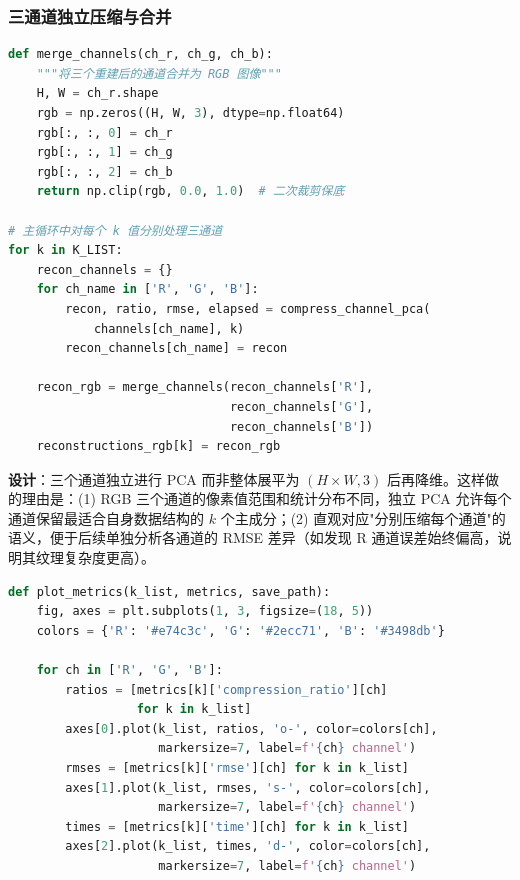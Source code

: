 \documentclass[a4paper]{article}
\begin{document}
\subsubsection{三通道独立压缩与合并}

\begin{lstlisting}[language=Python, caption=rgb_task.py——三通道独立PCA + 合并]
def merge_channels(ch_r, ch_g, ch_b):
    """将三个重建后的通道合并为 RGB 图像"""
    H, W = ch_r.shape
    rgb = np.zeros((H, W, 3), dtype=np.float64)
    rgb[:, :, 0] = ch_r
    rgb[:, :, 1] = ch_g
    rgb[:, :, 2] = ch_b
    return np.clip(rgb, 0.0, 1.0)  # 二次裁剪保底

# 主循环中对每个 k 值分别处理三通道
for k in K_LIST:
    recon_channels = {}
    for ch_name in ['R', 'G', 'B']:
        recon, ratio, rmse, elapsed = compress_channel_pca(
            channels[ch_name], k)
        recon_channels[ch_name] = recon

    recon_rgb = merge_channels(recon_channels['R'],
                               recon_channels['G'],
                               recon_channels['B'])
    reconstructions_rgb[k] = recon_rgb
\end{lstlisting}

\textbf{设计}：三个通道独立进行 PCA 而非整体展平为 $(H \times W, 3)$ 后再降维。这样做的理由是：(1) RGB 三个通道的像素值范围和统计分布不同，独立 PCA 允许每个通道保留最适合自身数据结构的 $k$ 个主成分；(2) 直观对应"分别压缩每个通道"的语义，便于后续单独分析各通道的 RMSE 差异（如发现 R 通道误差始终偏高，说明其纹理复杂度更高）。

\begin{lstlisting}[language=Python, caption=rgb_task.py——三指标子图布局]
def plot_metrics(k_list, metrics, save_path):
    fig, axes = plt.subplots(1, 3, figsize=(18, 5))
    colors = {'R': '#e74c3c', 'G': '#2ecc71', 'B': '#3498db'}

    for ch in ['R', 'G', 'B']:
        ratios = [metrics[k]['compression_ratio'][ch]
                  for k in k_list]
        axes[0].plot(k_list, ratios, 'o-', color=colors[ch],
                     markersize=7, label=f'{ch} channel')
        rmses = [metrics[k]['rmse'][ch] for k in k_list]
        axes[1].plot(k_list, rmses, 's-', color=colors[ch],
                     markersize=7, label=f'{ch} channel')
        times = [metrics[k]['time'][ch] for k in k_list]
        axes[2].plot(k_list, times, 'd-', color=colors[ch],
                     markersize=7, label=f'{ch} channel')
\end{lstlisting}
\end{document}
